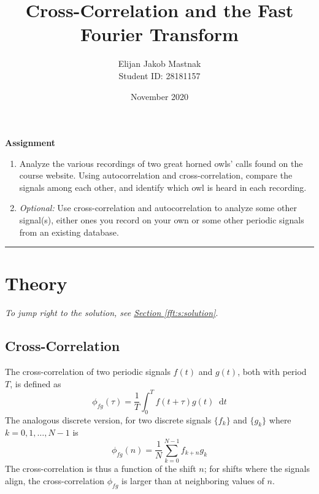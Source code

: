 \documentclass[11pt, a4paper]{article}
\newcommand{\diff}{\mathop{}\!\mathrm{d}} %
\begin{document}
\title{Cross-Correlation and the Fast Fourier Transform}
\author{Elijan Jakob Mastnak\\[1mm]\small{Student ID: 28181157}}
\date{November 2020}
\maketitle


\tableofcontents

\newpage
\begin{center}
\textbf{Assignment}
\begin{enumerate}
	\item Analyze the various recordings of two great horned owls' calls found on the course website.  Using autocorrelation and cross-correlation, compare the signals among each other, and identify which owl is heard in each recording. 
	
	\item \textit{Optional:} Use cross-correlation and autocorrelation to analyze some other signal(s), either ones you record on your own or some other periodic signals from an existing database.
\end{enumerate}
\end{center}

\vspace{2mm}

\rule{\textwidth}{0.2pt}

\section{Theory} \label{fft:s:theory}
\vspace{-2mm}
\textit{To jump right to the solution, see \hyperref[fft:s:solution]{Section \ref{fft:s:solution}}}.

\subsection{Cross-Correlation}
The cross-correlation of two periodic signals $ f(t) $ and $ g(t) $, both with period $ T $, is defined as
\begin{equation*}
	\phi_{fg}(\tau) = \frac{1}{T}\int_{0}^{T}f(t + \tau)g(t) \diff t
\end{equation*}
The analogous discrete version, for two discrete signals $ \{f_{k}\} $ and $ \{g_{k}\} $ where $ k = 0, 1, \ldots, N -1 $ is
\begin{equation*}
	\phi_{fg}(n) = \frac{1}{N}\sum_{k = 0}^{N-1}f_{k+n}g_{k}
\end{equation*}
The cross-correlation is thus a function of the shift $ n $; for shifts where the signals align, the cross-correlation $ \phi_{fg} $ is larger than at neighboring values of $ n $.
\end{document}
